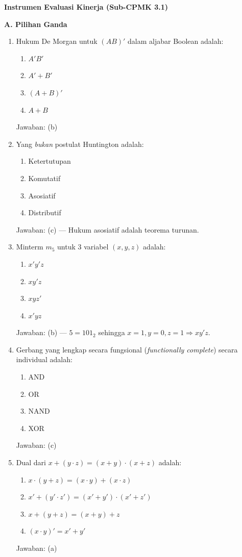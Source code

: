\documentclass[../main]{subfiles}
\begin{document}
\begin{asesmen}
\textbf{Instrumen Evaluasi Kinerja (Sub-CPMK 3.1)}

\textbf{A. Pilihan Ganda}
\begin{enumerate}
  \item Hukum De Morgan untuk $(AB)'$ dalam aljabar Boolean adalah:
  \begin{enumerate}
    \item $A'B'$
    \item $A' + B'$
    \item $(A+B)'$
    \item $A+B$
  \end{enumerate}
  Jawaban: (b)

  \item Yang \emph{bukan} postulat Huntington adalah:
  \begin{enumerate}
    \item Ketertutupan
    \item Komutatif
    \item Asosiatif
    \item Distributif
  \end{enumerate}
  Jawaban: (c) --- Hukum asosiatif adalah teorema turunan.

  \item Minterm $m_5$ untuk 3 variabel $(x, y, z)$ adalah:
  \begin{enumerate}
    \item $x'y'z$
    \item $xy'z$
    \item $xyz'$
    \item $x'yz$
  \end{enumerate}
  Jawaban: (b) --- $5 = 101_2$ sehingga $x=1, y=0, z=1 \Rightarrow xy'z$.

  \item Gerbang yang lengkap secara fungsional (\textit{functionally complete}) secara individual adalah:
  \begin{enumerate}
    \item AND
    \item OR
    \item NAND
    \item XOR
  \end{enumerate}
  Jawaban: (c)

  \item Dual dari $x + (y \cdot z) = (x + y) \cdot (x + z)$ adalah:
  \begin{enumerate}
    \item $x \cdot (y + z) = (x \cdot y) + (x \cdot z)$
    \item $x' + (y' \cdot z') = (x' + y') \cdot (x' + z')$
    \item $x + (y + z) = (x + y) + z$
    \item $(x \cdot y)' = x' + y'$
  \end{enumerate}
  Jawaban: (a)
\end{enumerate}


\end{asesmen}
\end{document}
